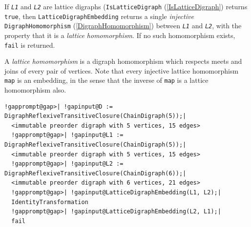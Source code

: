 \documentclass[a4paper,11pt]{report}
\begin{document}
{{{ If \mbox{\texttt{\mdseries\slshape L1}} and \mbox{\texttt{\mdseries\slshape L2}} are lattice digraphs (\texttt{IsLatticeDigraph} (\ref{IsLatticeDigraph}) returns \texttt{true}, then \texttt{LatticeDigraphEmbedding} returns a single \emph{injective} \texttt{DigraphHomomorphism} (\ref{DigraphHomomorphism}) between \mbox{\texttt{\mdseries\slshape L1}} and \mbox{\texttt{\mdseries\slshape L2}}, with the property that it is a \emph{lattice homomorphism}. If no such homomorphism exists, \texttt{fail} is returned.

 A \emph{lattice homomorphism} is a digraph homomorphism which respects meets and joins of every pair of
vertices. Note that every injective lattice homomorphism \texttt{map} is an embedding, in the sense that the inverse of \texttt{map} is a lattice homomorphism also. 
\begin{Verbatim}[commandchars=!@|,fontsize=\small,frame=single,label=Example]
  !gapprompt@gap>| !gapinput@D := DigraphReflexiveTransitiveClosure(ChainDigraph(5));|
  <immutable preorder digraph with 5 vertices, 15 edges>
  !gapprompt@gap>| !gapinput@L1 := DigraphReflexiveTransitiveClosure(ChainDigraph(5));|
  <immutable preorder digraph with 5 vertices, 15 edges>
  !gapprompt@gap>| !gapinput@L2 := DigraphReflexiveTransitiveClosure(ChainDigraph(6));|
  <immutable preorder digraph with 6 vertices, 21 edges>
  !gapprompt@gap>| !gapinput@LatticeDigraphEmbedding(L1, L2);|
  IdentityTransformation
  !gapprompt@gap>| !gapinput@LatticeDigraphEmbedding(L2, L1);|
  fail
\end{Verbatim}
 }

 

}}
\end{document}
